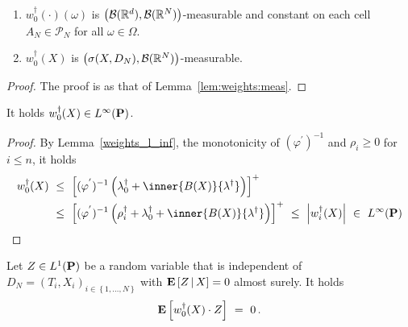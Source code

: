 \begin{lemma}
  \label{lem:weights:meas:0}
  \quad
  \begin{enumerate}[label=(\roman*)]
\item
  $w_0^\dagger(\cdot)(\omega)$ is 
  $\left(
    \mathcal{B}(\R^d),\mathcal{B}(\R^N)
  \right)$-measurable
  and
  constant on each cell 
  $A_N\in\mathcal{P}_N$
  for all $\omega\in\Omega$. 
\item
  $w_0^\dagger(X)$ is $\left(
    \sigma(X,D_N),\mathcal{B}(\R^N)
  \right)$-measurable. 
  \end{enumerate}
\end{lemma}
\begin{proof}
The proof is as that of Lemma~\ref{lem:weights:meas}.
\end{proof}


\begin{lemma}
  \label{weights_0_l_inf}
  It holds $w_0^\dagger(X)\in L^\infty(\P)$.
\end{lemma}
\begin{proof}
  By Lemma~\ref{weights_l_inf},
  the monotonicity of 
  $
  (\varphi^{'})^{-1}
  $
  and $\rho_i\ge 0$ for $i\le n$,
  it holds
  \begin{align*}
    w_0^\dagger(X) 
    &
    \ 
    \le
    \ 
  \left[ 
  (\varphi^{'})^{-1}
  \left( 
    \lambda_0^\dagger
    +
    \inner
    {B(X)}
    {\lambda^\dagger}
  \right)
\right]^+
\\
&
\ 
\le
\ 
  \left[ 
  (\varphi^{'})^{-1}
  \left( 
    \rho_i^\dagger
    +
    \lambda_0^\dagger
    +
    \inner
    {B(X)}
    {\lambda^\dagger}
  \right)
\right]^+
\ 
\le
\ 
\left| 
    w_i^\dagger(X) 
\right|
\ 
\in
\ 
L^\infty(\P)
  \end{align*}
\end{proof}
\begin{lemma}
  \label{w.Z=0}
 Let 
 $Z\in L^1(\P)$
  be a random variable that is independent of $D_N=(T_i,X_i)_{i\in \left\{
    1,\ldots,N
  \right\}}$ 
  with
  $
\E
\left[
  Z
  \,
  |
  \, 
  X
\right]
= 0
  $
  almost surely.
  It holds
  \begin{gather*}
  \E
  \left[
    w_0^\dagger(X)
  \cdot Z
  \right]
  \ 
  =
  \ 
  0
  \,.
  \end{gather*}
\end{lemma}
